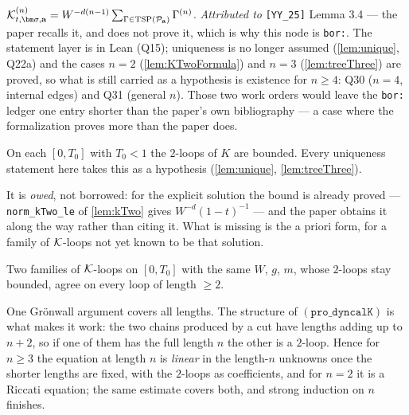 \begin{theorem}\label{bor:KTreeRep}
  $\Kcal^{(n)}_{t,\bm\sigma,\mathbf a}=W^{-d(n-1)}\sum_{\Gamma\in\mathrm{TSP}(\mathcal P_{\mathbf a})}\Gamma^{(n)}$.
  \emph{Attributed to} \texttt{[YY\_25]} Lemma 3.4 --- the paper recalls it, and does not
  prove it, which is why this node is \texttt{bor:}.  The statement layer is in Lean (Q15);
  uniqueness is no longer assumed (\ref{lem:unique}, Q22a) and the cases $n=2$
  (\ref{lem:KTwoFormula}) and $n=3$ (\ref{lem:treeThree}) are proved, so what is still
  carried as a hypothesis is existence for $n\ge4$: Q30 ($n=4$, internal edges) and
  Q31 (general $n$).  Those two work orders would leave the \texttt{bor:} ledger one
  entry shorter than the paper's own bibliography --- a case where the formalization
  proves more than the paper does.
\end{theorem}

\begin{theorem}\label{hyp:twoloop}
  On each $[0,T_0]$ with $T_0<1$ the $2$-loops of $K$ are bounded.  Every uniqueness
  statement here takes this as a hypothesis (\ref{lem:unique}, \ref{lem:treeThree}).

  It is \emph{owed}, not borrowed: for the explicit solution the bound is already proved
  --- \texttt{norm\_kTwo\_le} of \ref{lem:kTwo} gives $W^{-d}(1-t)^{-1}$ --- and the paper
  obtains it along the way rather than citing it.  What is missing is the a priori form,
  for a family of $\mathcal{K}$-loops not yet known to be that solution.
\end{theorem}

\begin{lemma}\label{lem:unique}
  \leanok
  Two families of $\mathcal{K}$-loops on $[0,T_0]$ with the same $W$, $g$, $m$, whose $2$-loops
  stay bounded, agree on every loop of length $\ge2$.

  One Grönwall argument covers all lengths.  The structure of $\mathtt{(pro\_dyncalK)}$ is
  what makes it work: the two chains produced by a cut have lengths adding up to $n+2$, so
  if one of them has the full length $n$ the other is a $2$-loop.  Hence for $n\ge3$ the
  equation at length $n$ is \emph{linear} in the length-$n$ unknowns once the shorter
  lengths are fixed, with the $2$-loops as coefficients, and for $n=2$ it is a Riccati
  equation; the same estimate covers both, and strong induction on $n$ finishes.
\end{lemma}

